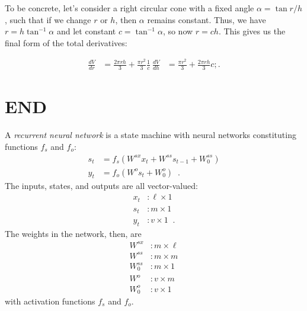     To be concrete, let's consider a right circular cone with a fixed angle $\alpha = \tan r / h$, such that if we change $r$ or $h$, then $\alpha$ remains constant. Thus, we have $r = h \tan^{-1} \alpha$ and let constant $c = \tan^{-1} \alpha$, so now $r = c h$. This gives us the final form of the total derivatives:
    
    \begin{align*}
    \frac{dV}{dr} & = \frac{2 \pi r h}{3} + \frac{\pi r^2}{3} \frac{1}{c} \
    \frac{dV}{dh} & = \frac{\pi r^2}{3} + \frac{2 \pi r h}{3} c ; .
    \end{align*}
    















    
\section{END}






    

\bigskip


A {\it recurrent neural network} is a state machine with neural
networks constituting functions $f_s$ and $f_o$:
\begin{align}
  s_t & = f_s\left(W^{sx}x_t + W^{ss}s_{t - 1} + W^{ss}_0\right) \\
  y_t & = f_o\left(W^o s_t + W_0^o\right) \;\;.
\end{align}
The inputs, states, and outputs are all vector-valued:
\begin{align}
x_t &: \ell \times 1 \\
s_t &: m \times 1 \\
y_t &: v \times 1 \;\;.
\end{align}
The weights in the network,  then,  are
\begin{align}
W^{sx} &:  m \times \ell \\
W^{ss} &: m \times m \\
W^{ss}_0 &: m \times 1 \\
W^{o} &: v \times m \\
W^{o}_0 &: v \times 1 
\end{align}
with activation functions $f_s$  and $f_o$.  

